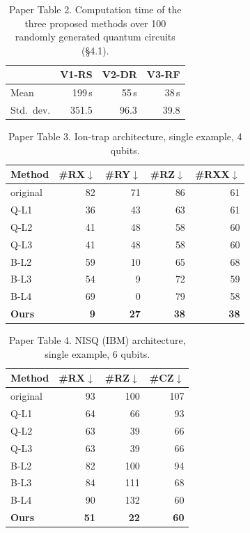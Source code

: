 \documentclass[11pt,a4paper]{article}
\begin{document}
\begin{table}[H]
\centering
\caption{Paper Table 2. Computation time of the three proposed methods
over 100 randomly generated quantum circuits (\S4.1).}
\begin{tabular}{lrrr}
\toprule
 & V1-RS & V2-DR & V3-RF \\
\midrule
Mean & 199\,s & 55\,s & 38\,s \\
Std.\ dev. & 351.5 & 96.3 & 39.8 \\
\bottomrule
\end{tabular}
\end{table}

\begin{table}[H]
\centering
\caption{Paper Table 3. Ion-trap architecture, single example, 4 qubits.}
\begin{tabular}{lrrrr}
\toprule
Method & \#RX$\downarrow$ & \#RY$\downarrow$ & \#RZ$\downarrow$ & \#RXX$\downarrow$ \\
\midrule
original & 82 & 71 & 86 & 61 \\
Q-L1 & 36 & 43 & 63 & 61 \\
Q-L2 & 41 & 48 & 58 & 60 \\
Q-L3 & 41 & 48 & 58 & 60 \\
B-L2 & 59 & 10 & 65 & 68 \\
B-L3 & 54 & 9 & 72 & 59 \\
B-L4 & 69 & 0 & 79 & 58 \\
\textbf{Ours} & \textbf{9} & \textbf{27} & \textbf{38} & \textbf{38} \\
\bottomrule
\end{tabular}
\end{table}

\begin{table}[H]
\centering
\caption{Paper Table 4. NISQ (IBM) architecture, single example, 6 qubits.}
\begin{tabular}{lrrr}
\toprule
Method & \#RX$\downarrow$ & \#RZ$\downarrow$ & \#CZ$\downarrow$ \\
\midrule
original & 93 & 100 & 107 \\
Q-L1 & 64 & 66 & 93 \\
Q-L2 & 63 & 39 & 66 \\
Q-L3 & 63 & 39 & 66 \\
B-L2 & 82 & 100 & 94 \\
B-L3 & 84 & 111 & 68 \\
B-L4 & 90 & 132 & 60 \\
\textbf{Ours} & \textbf{51} & \textbf{22} & \textbf{60} \\
\bottomrule
\end{tabular}
\end{table}
\end{document}
